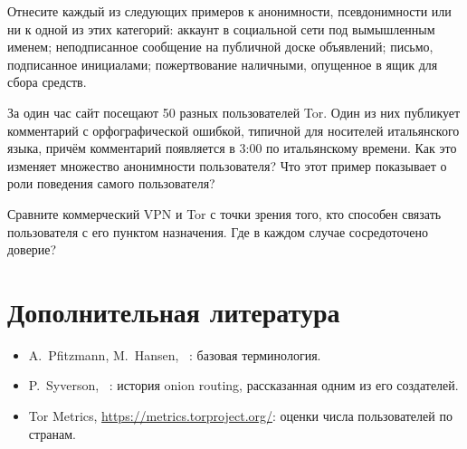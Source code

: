 \begin{esercizio}[1]\label{es:01-termini}
Отнесите каждый из следующих примеров к анонимности, псевдонимности или ни к одной из этих категорий: аккаунт в социальной сети под вымышленным именем; неподписанное сообщение на публичной доске объявлений; письмо, подписанное инициалами; пожертвование наличными, опущенное в ящик для сбора средств.
\end{esercizio}

\begin{esercizio}[2]\label{es:01-insieme}
За один час сайт посещают 50 разных пользователей Tor. Один из них публикует комментарий с орфографической ошибкой, типичной для носителей итальянского языка, причём комментарий появляется в 3:00 по итальянскому времени. Как это изменяет множество анонимности пользователя? Что этот пример показывает о роли поведения самого пользователя?
\end{esercizio}

\begin{esercizio}[2]\label{es:01-vpn}
Сравните коммерческий VPN и Tor с точки зрения того, кто способен связать пользователя с его пунктом назначения. Где в каждом случае сосредоточено доверие?
\end{esercizio}

\section*{Дополнительная литература}
\begin{itemize}
  \item A.~Pfitzmann, M.~Hansen, ~\cite{pfitzmann2010terminology}: базовая терминология.
  \item P.~Syverson, ~\cite{syverson2011peel}: история onion routing, рассказанная одним из его создателей.
  \item Tor Metrics, \url{https://metrics.torproject.org/}: оценки числа пользователей по странам.
\end{itemize}
